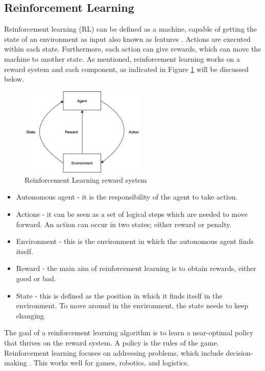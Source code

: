 \subsection{Reinforcement Learning}

Reinforcement learning (RL) can be defined as a machine, capable of getting the state of an environment as input also known as features \cite{DBLP:journals/corr/abs-1806-08894}. Actions are executed within each state. Furthermore, each action can give rewards, which can move the machine to another state. As mentioned, reinforcement learning works on a reward system and each component, as indicated in Figure \ref{fig:RLreward} will be discussed below.


\begin{figure}[htbp]
\centering
\includegraphics[width=6cm]{./figures/reinforce7.png}
\caption{Reinforcement Learning reward system \protect\cite{sebastiani2002machine}}
\label{fig:RLreward}
\end{figure}
\begin{itemize}
  \item Autonomous agent - it is the  responsibility of the agent to take action.
  \item Actions - it can be seen as a set of logical steps which are needed to move forward. An action can occur in two states; either reward or penalty.
  \item Environment - this is the environment in which the autonomous agent finds itself.
  \item Reward - the main aim of reinforcement learning is to obtain rewards, either good or bad.
  \item State - this is defined as the position in which it finds itself in the environment. To move around in the environment, the state needs to keep changing.
\end{itemize}

The goal of a reinforcement learning algorithm is to learn a near-optimal policy that thrives on the reward system. A policy is the rules of the game. Reinforcement learning focuses on addressing problems, which include decision-making \cite{Andriybook2019}. This works well for games, robotics, and logistics.


